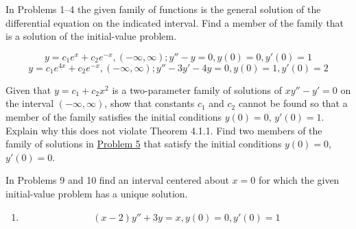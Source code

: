 \documentclass[12pt]{report}
\begin{document}
In Problems 1--4 the given family of functions is the general solution of the differential equation on the indicated interval. Find a member of the family that is a solution of the initial-value problem.
\begin{enumerate}[label=\arabic*.]
	 \[ y = c_{1}e^{x} + c_{2}e^{-x}, (-\infty, \infty); y'' - y = 0, y(0) = 0, y'(0)=1 \]
	 \[ y = c_{1}e^{4x} + c_{2}e^{-x}, (-\infty, \infty); y'' - 3y' - 4y = 0, y(0) = 1, y'(0) = 2 \]
\end{enumerate}

\begin{enumerate}[label=\arabic*., start=5]
     Given that $y=c_{1} + c_{2}x^{2}$ is a two-parameter family of solutions of $xy'' - y' = 0$ on the interval $(-\infty, \infty)$, show that constants $c_{1}$ and $c_{2}$ cannot be found so that a member of the family satisfies the initial conditions $y(0)=0$, $y'(0)=1$. Explain why this does not violate Theorem 4.1.1.
	 Find two members of the family of solutions in \hyperref[prb:5]{Problem 5} that satisfy the initial conditions $y(0)=0$, $y'(0)=0$.
\end{enumerate}

In Problems 9 and 10 find an interval centered about $x=0$ for which the given initial-value problem has a unique solution.
\begin{enumerate}[label=\arabic*), start=9]
    \item \[ (x-2)y'' + 3y = x, y(0)=0, y'(0)=1 \]
\end{enumerate}
\end{document}
